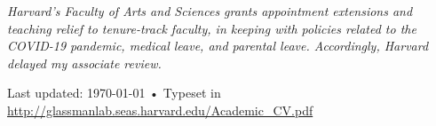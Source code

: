 \documentclass[10pt, a4paper]{article}
\begin{document}




 



\newpage

\textit{Harvard’s Faculty of Arts and Sciences grants appointment extensions and teaching relief to tenure-track faculty, in keeping with policies related to the COVID-19 pandemic, medical leave, and parental leave. Accordingly, Harvard delayed my associate review.}



\vfill{}

\begin{center}
{\scriptsize  Last updated: \today\- •\- 
Typeset in \href{http://nitens.org/taraborelli/cvtex}{
\XeTeX }\\
\href{http://glassmanlab.seas.harvard.edu/Academic_CV.pdf}{http://glassmanlab.seas.harvard.edu/Academic\_CV.pdf}}
\end{center}
\end{document}
